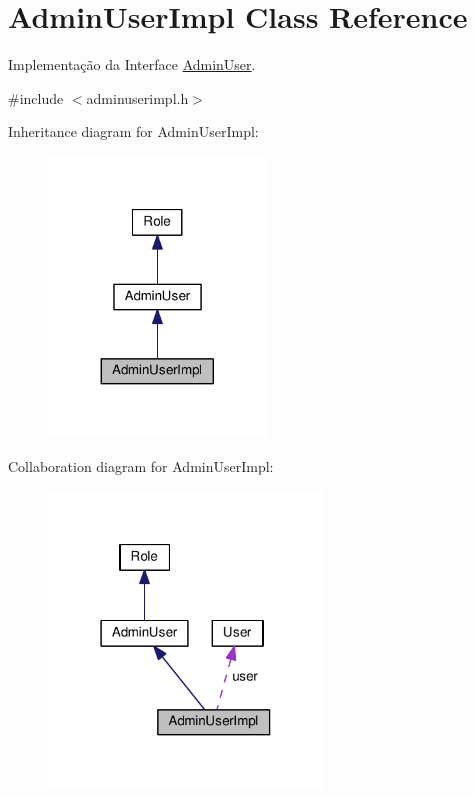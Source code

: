 \hypertarget{classAdminUserImpl}{}\section{Admin\+User\+Impl Class Reference}
\label{classAdminUserImpl}


Implementação da Interface \hyperlink{classAdminUser}{Admin\+User}.  




{\ttfamily \#include $<$adminuserimpl.\+h$>$}



Inheritance diagram for Admin\+User\+Impl\+:
\nopagebreak
\begin{figure}[H]
\begin{center}
\leavevmode
\includegraphics[width=164pt]{d6/d85/classAdminUserImpl__inherit__graph}
\end{center}
\end{figure}


Collaboration diagram for Admin\+User\+Impl\+:
\nopagebreak
\begin{figure}[H]
\begin{center}
\leavevmode
\includegraphics[width=207pt]{df/dc0/classAdminUserImpl__coll__graph}
\end{center}
\end{figure}
